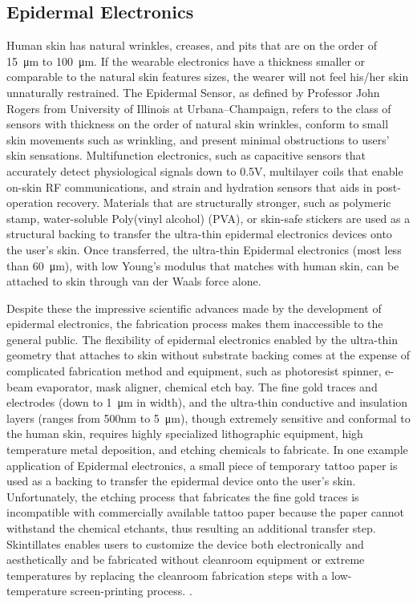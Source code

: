 \documentclass{sigchi}
\begin{document}
\subsection{Epidermal Electronics}
Human skin has natural wrinkles, creases, and pits that are on the order of \SI{15}{\micro\metre} to \SI{100}{\micro\metre}\cite{Tchvialeva:2014wla}. If the wearable electronics have a thickness smaller or comparable to the natural skin features sizes, the wearer will not feel his/her skin unnaturally restrained\cite{Kim:2011bv}. The Epidermal Sensor, as defined by Professor John Rogers from University of Illinois at Urbana–Champaign, refers to the class of sensors with thickness on the order of natural skin wrinkles, conform to small skin movements such as wrinkling, and present minimal obstructions to users’ skin sensations\cite{Kim:2011bv}. Multifunction electronics, such as capacitive sensors that accurately detect physiological signals down to 0.5V, multilayer coils that enable on-skin RF communications, and strain and hydration sensors that aids in post-operation recovery\cite{Jeong:2013km,Kim:2014iq,Bandodkar:2014dl,Kim:2011bv}. %
Materials that are structurally stronger, such as polymeric stamp, water-soluble Poly(vinyl alcohol) (PVA), or skin-safe stickers are used as a structural backing to transfer the ultra-thin epidermal electronics devices onto the user's skin\cite{Son:2014iya}. Once transferred, the ultra-thin Epidermal electronics (most less than \SI{60}{\micro\metre}), with low Young's modulus that matches with human skin, can be attached to skin through van der Waals force alone\cite{Son:2014iya,Kim:2011bv}. 

Despite these the impressive scientific advances made by the development of epidermal electronics, the fabrication process makes them inaccessible to the general public. The flexibility of epidermal electronics enabled by the ultra-thin geometry that attaches to skin without substrate backing comes at the expense of complicated fabrication method and equipment, such as photoresist spinner, e-beam evaporator, mask aligner, chemical etch bay. The fine gold traces and electrodes (down to \SI{1}{\micro\metre} in width), and the ultra-thin conductive and insulation layers (ranges from 500nm to 5\SI{}{\micro\metre}), though extremely sensitive and conformal to the human skin, requires highly specialized lithographic equipment, high temperature metal deposition, and etching chemicals to fabricate\cite{Kim:2011bv,Kim:2014iq}. In one example application of Epidermal electronics, a small piece of temporary tattoo paper is used as a backing to transfer the epidermal device onto the user's skin\cite{Kim:2011bv}. Unfortunately, the etching process that fabricates the fine gold traces is incompatible with commercially available tattoo paper because the paper cannot withstand the chemical etchants, thus resulting an additional transfer step. Skintillates enables users to customize the device both electronically and aesthetically and be fabricated without cleanroom equipment or extreme temperatures by replacing the cleanroom fabrication steps with a low-temperature screen-printing process. . 
\end{document}
